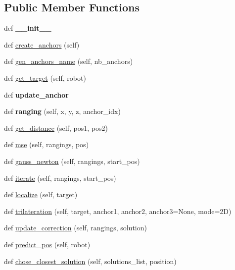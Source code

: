 \subsection*{Public Member Functions}
\begin{DoxyCompactItemize}
\item 
\mbox{\label{classworld_1_1_world_ac775ee34451fdfa742b318538164070e}} 
def {\bfseries \+\_\+\+\_\+init\+\_\+\+\_\+}
\item 
def \mbox{\hyperlink{classworld_1_1_world_afc14fa698ef83ef5c8e17a2ee98d1375}{create\+\_\+anchors}} (self)
\item 
def \mbox{\hyperlink{classworld_1_1_world_a660f28d74c53fc654edf9e0d60c68d45}{gen\+\_\+anchors\+\_\+name}} (self, nb\+\_\+anchors)
\item 
def \mbox{\hyperlink{classworld_1_1_world_afdf01fd0b61dfe848a1606619c1b2902}{get\+\_\+target}} (self, robot)
\item 
\mbox{\label{classworld_1_1_world_a55dd74ce9332b8fb3f6d5ff5dbd22aca}} 
def {\bfseries update\+\_\+anchor}
\item 
\mbox{\label{classworld_1_1_world_abfeee52c12f31bb94f7d6699303b515f}} 
def {\bfseries ranging} (self, x, y, z, anchor\+\_\+idx)
\item 
def \mbox{\hyperlink{classworld_1_1_world_a04f4980a53d4b6e76ba5d02deb413780}{get\+\_\+distance}} (self, pos1, pos2)
\item 
def \mbox{\hyperlink{classworld_1_1_world_a5c63acf39eabba08715324da0d0ba2bd}{mse}} (self, rangings, pos)
\item 
def \mbox{\hyperlink{classworld_1_1_world_a9ee2b3e42f5d883afd028a9526c392d1}{gauss\+\_\+newton}} (self, rangings, start\+\_\+pos)
\item 
def \mbox{\hyperlink{classworld_1_1_world_a68d603f9d2b9759ddca06127f0899689}{iterate}} (self, rangings, start\+\_\+pos)
\item 
def \mbox{\hyperlink{classworld_1_1_world_a5b503b944cc95fd96a0e04f48e8c46fc}{localize}} (self, target)
\item 
def \mbox{\hyperlink{classworld_1_1_world_abd1ed1c4492cfa667fe9fda253df6173}{trilateration}} (self, target, anchor1, anchor2, anchor3=None, mode=\textquotesingle{}2\+D\textquotesingle{})
\item 
def \mbox{\hyperlink{classworld_1_1_world_a6886efcaba6a255c9d7566ba44f518f9}{update\+\_\+correction}} (self, rangings, solution)
\item 
def \mbox{\hyperlink{classworld_1_1_world_a34e56a6b0b7a51cc806cd0648a7ed275}{predict\+\_\+pos}} (self, robot)
\item 
def \mbox{\hyperlink{classworld_1_1_world_ad5a97b080a28cc5abda3903a686a56ff}{chose\+\_\+closest\+\_\+solution}} (self, solutions\+\_\+list, position)
\end{DoxyCompactItemize}
